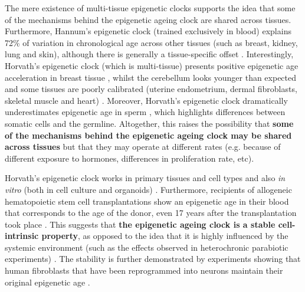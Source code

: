 \bigskip

The mere existence of multi-tissue epigenetic clocks supports the idea that some of the mechanisms behind the epigenetic ageing clock are shared across tissues. Furthermore, Hannum's epigenetic clock (trained exclusively in blood) explains 72\% of variation in chronological age across other tissues (such as breast, kidney, lung and skin), although there is generally a tissue-specific offset \cite{Hannum2013}. Interestingly, Horvath's epigenetic clock (which is multi-tissue) presents positive epigenetic age acceleration in breast tissue \cite{Sehl2017}, whilst the cerebellum looks younger than expected \cite{Horvath2015} and some tissues are poorly calibrated (uterine endometrium, dermal fibroblasts, skeletal muscle and heart) \cite{Horvath2013}. Moreover, Horvath's epigenetic clock dramatically underestimates epigenetic age in sperm \cite{Horvath2013}, which highlights differences between somatic cells and the germline. Altogether, this raises the possibility that \textbf{some of the mechanisms behind the epigenetic ageing clock may be shared across tissues} but that they may operate at different rates (e.g. because of different exposure to hormones, differences in proliferation rate, etc). 

\bigskip

Horvath's epigenetic clock works in primary tissues and cell types and also \textit{in vitro} (both in cell culture and organoids) \cite{Horvath2013,Hoshino2019}. Furthermore, recipients of allogeneic hematopoietic stem cell transplantations show an epigenetic age in their blood that corresponds to the age of the donor, even 17 years after the transplantation took place \cite{Soraas2019}. This suggests that \textbf{the epigenetic ageing clock is a stable cell-intrinsic property}, as opposed to the idea that it is highly influenced by the systemic environment (such as the effects observed in heterochronic parabiotic experiments) \cite{Conboy2005}. The stability is further demonstrated by experiments showing that human fibroblasts that have been reprogrammed into neurons maintain their original epigenetic age \cite{Huh2016}.     

\bigskip

